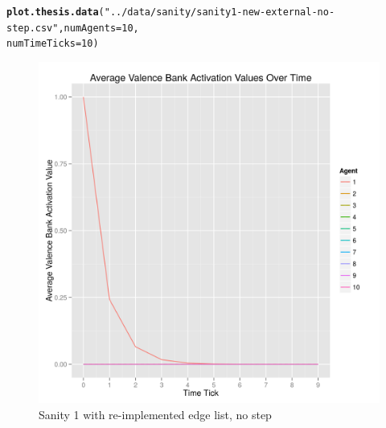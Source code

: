 \documentclass{article}\usepackage[]{graphicx}\usepackage[]{color}
\makeatletter
\def\maxwidth{ %
  \ifdim\Gin@nat@width>\linewidth
    \linewidth
  \else
    \Gin@nat@width
  \fi
}
\newcommand{\hlnum}[1]{\textcolor[rgb]{0.686,0.059,0.569}{#1}}%
\newcommand{\hlstr}[1]{\textcolor[rgb]{0.192,0.494,0.8}{#1}}%
\newcommand{\hlstd}[1]{\textcolor[rgb]{0.345,0.345,0.345}{#1}}%
\newcommand{\hlkwc}[1]{\textcolor[rgb]{0.333,0.667,0.333}{#1}}%
\newcommand{\hlkwd}[1]{\textcolor[rgb]{0.737,0.353,0.396}{\textbf{#1}}}%
\newenvironment{kframe}{%
 \def\at@end@of@kframe{}%
 \ifinner\ifhmode%
  \def\at@end@of@kframe{\end{minipage}}%
  \begin{minipage}{\columnwidth}%
 \fi\fi%
 \def\FrameCommand##1{\hskip\@totalleftmargin \hskip-\fboxsep
 \colorbox{shadecolor}{##1}\hskip-\fboxsep
     \hskip-\linewidth \hskip-\@totalleftmargin \hskip\columnwidth}%
 \MakeFramed {\advance\hsize-\width
   \@totalleftmargin\z@ \linewidth\hsize
   \@setminipage}}%
 {\par\unskip\endMakeFramed%
 \at@end@of@kframe}
\newenvironment{knitrout}{}{} %
\makeatother
\begin{document}
\newpage
\begin{knitrout}
\color{fgcolor}\begin{kframe}
\begin{alltt}
\hlkwd{plot.thesis.data}\hlstd{(}\hlstr{"../data/sanity/sanity1-new-external-no-step.csv"}\hlstd{,} \hlkwc{numAgents} \hlstd{=} \hlnum{10}\hlstd{,}
    \hlkwc{numTimeTicks} \hlstd{=} \hlnum{10}\hlstd{)}
\end{alltt}


{\ttfamily\noindent\itshape\color{messagecolor}{\#\# Loading required package: ggplot2\\\#\# Loading required package: scales}}\end{kframe}\begin{figure}[]

\includegraphics[width=\maxwidth]{figure/plot-sanity1-v2-nostep} \caption[Sanity 1 with re-implemented edge list, no step]{Sanity 1 with re-implemented edge list, no step\label{fig:plot-sanity1-v2-nostep}}
\end{figure}


\end{knitrout}


\newpage
\end{document}

